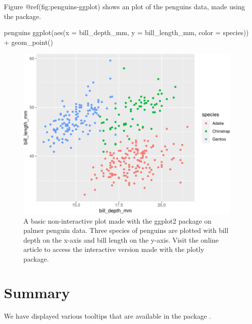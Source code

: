 Figure @ref(fig:penguins-ggplot) shows an plot of the penguins data,
made using the  package.

\begin{Schunk}
\begin{Sinput}
penguins %
  ggplot(aes(x = bill_depth_mm, y = bill_length_mm, 
             color = species)) + 
  geom_point()
\end{Sinput}
\begin{figure}
\includegraphics{article_files/figure-latex/penguins-ggplot-1} \caption[A basic non-interactive plot made with the ggplot2 package on palmer penguin data]{A basic non-interactive plot made with the ggplot2 package on palmer penguin data. Three species of penguins are plotted with bill depth on the x-axis and bill length on the y-axis. Visit the online article to access the interactive version made with the plotly package.}\label{fig:penguins-ggplot}
\end{figure}
\end{Schunk}

\hypertarget{summary}{%
\section{Summary}\label{summary}}

We have displayed various tooltips that are available in the package
.



\address{%
Quietest Quokka\\
University of Little Mates\\%
Department of Letter Q\\ Somewhere, Australia\\
%
\url{https://www.britannica.com/animal/quokka}\\%
\textit{ORCiD: \href{https://orcid.org/0000-1721-1511-1101}{0000-1721-1511-1101}}\\%
\href{mailto:qquo@ulm.edu}{\nolinkurl{qquo@ulm.edu}}%
}

\address{%
Bounciest Bilby\\
University of Little Mates\\%
Department of Letter B\\ Somewhere, Australia\\
%
\url{https://www.britannica.com/animal/bilby}\\%
\textit{ORCiD: \href{https://orcid.org/0000-0002-0912-0225}{0000-0002-0912-0225}}\\%
\href{mailto:bbil@ulm.edu}{\nolinkurl{bbil@ulm.edu}}%
}
